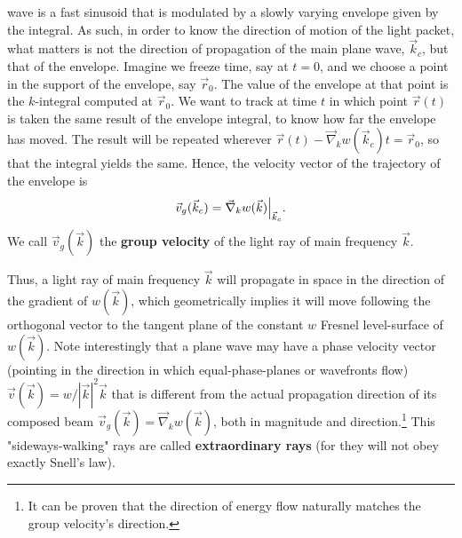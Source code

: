 \documentclass[11pt, a4paper, twoside]{article} %
\DeclareRobustCommand{\mybox}[2][gray!10]{%
\begin{tcolorbox}[   %
        left=0.2cm,
        right=0.2cm,
        top=0.15cm,
        bottom=0.15cm,
        colback=#1,
        colframe=#1,
        width=\dimexpr\textwidth\relax, 
        enlarge left by=0mm,
        boxsep=5pt,
        arc=0pt,outer arc=0pt,
        ]
        #2
\end{tcolorbox}
}
\begin{document}
\mybox{ wave is a fast sinusoid that is modulated by a slowly varying envelope given by the integral. As such, in order to know the direction of motion of the light packet, what matters is not the direction of propagation of the main plane wave, $\vec{k}_c$, but that of the envelope. Imagine we freeze time, say at $t=0$, and we choose a point in the support of the envelope, say $\vec{r}_0$. The value of the envelope at that point is the $k$-integral computed at $\vec{r}_0$. We want to track at time $t$ in which point $\vec{r}(t)$ is taken the same result of the envelope integral, to know how far the envelope has moved. The result will be repeated wherever $\vec{r}(t)-\vec{\nabla}_kw(\vec{k}_c)t=\vec{r}_0$, so that the integral yields the same. Hence, the velocity vector of the trajectory of the envelope is\vspace{-0.15cm}
\begin{equation}
\vec{v}_g(\vec{k}_c)=\vec{\nabla}_kw(\vec{k})\Big\rvert_{\vec{k}_c}.\vspace{-0.15cm}
\end{equation}
We call $\vec{v}_g(\vec{k})$ the {\bf group velocity} of the light ray of main frequency $\vec{k}$.\vspace{-0.25cm}
}
Thus, a light ray of main frequency $\vec{k}$ will propagate in space in the direction of the gradient of $w(\vec{k})$, which geometrically implies it will move following the orthogonal vector to the tangent plane of the constant $w$ Fresnel level-surface of $w(\vec{k})$. Note interestingly that a plane wave may have a phase velocity vector (pointing in the direction in which equal-phase-planes or wavefronts flow) $\vec{v}(\vec{k})=w/|\vec{k}|^2\vec{k}$ that is different from the actual propagation direction of its composed beam $\vec{v}_g(\vec{k})=\vec{\nabla}_kw(\vec{k})$, both in magnitude and direction.\footnote{It can be proven that the direction of energy flow naturally matches the group velocity's direction.} This "sideways-walking" rays are called {\bf extraordinary rays} (for they will not obey exactly Snell's law).\vspace{-0.2cm}
\end{document}
